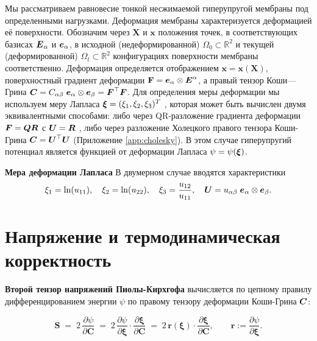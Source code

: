 Мы рассматриваем равновесие тонкой несжимаемой гиперупругой мембраны под определенными нагрузками.
Деформация мембраны характеризуется деформацией её поверхности. 
Обозначим через \(\mathbf{X}\) и \(\mathbf{x}\) положения точек, 
в соответствующих базисах \(\boldsymbol{E}_{\alpha}\) и \(\boldsymbol{e}_{\alpha}\), 
в исходной (недеформированной) \(\Omega_0 \subset \mathbb{R}^2\) и текущей (деформированной) \(\Omega_t \subset \mathbb{R}^2\)
конфигурациях поверхности мембраны соответственно. 
Деформация определяется отображением \(\mathbf{x} = \mathbf{x}(\mathbf{X})\), 
поверхностный градиент деформации \(\mathbf{F} = \boldsymbol{e}_{\alpha} \otimes \boldsymbol{E}^{\alpha}\),
а правый тензор Коши—Грина \(\boldsymbol{C} = C_{\alpha\beta} \;\boldsymbol{e}_{\alpha} \otimes \boldsymbol{e}_{\beta} = \boldsymbol{F}^{\top} \boldsymbol{F}\). 
Для определения меры деформации мы используем меру Лапласа \(\boldsymbol{\xi} = (\xi_1 , \xi_2 , \xi_3)^T\) \cite{xi2023},
которая может быть вычислен двумя эквивалентными способами: 
либо через QR-разложение градиента деформации \(\boldsymbol{F} = \boldsymbol{Q} \boldsymbol{R}\) с \(\boldsymbol{U} = \boldsymbol{R}\) , 
либо через разложение Холецкого правого тензора Коши-Грина \(\boldsymbol{C} = \boldsymbol{U}^{\top}\boldsymbol{U}\) (Приложение \ref{app:cholesky}).
В этом случае гиперупругий потенциал является функцией от деформации Лапласа \(\psi = \psi(\boldsymbol{\xi})\).


\textbf{Мера деформации Лапласа}
В двумерном случае вводятся характеристики
\begin{equation}
\xi_1 = \ln(u_{11}),\quad \xi_2 = \ln(u_{22}),\quad \xi_3 = \frac{u_{12}}{u_{11}}, 
\quad \boldsymbol{U} = u_{\alpha\beta} \; \boldsymbol{e}_{\alpha} \otimes \boldsymbol{e}_{\beta}.
\label{eq:laplace_coords}
\end{equation}



\section{Напряжение и термодинамическая корректность}
\textbf{Второй тензор напряжений Пиолы-Кирхгофа} вычисляется по цепному правилу дифференцированием энергии \(\psi\) 
по правому тензору деформации Коши-Грина \(\boldsymbol{C}\):

\begin{equation}
  \mathbf{S} \;=\; 2\,\frac{\partial \psi}{\partial \mathbf{C}}
  \;=\; 2\,\frac{\partial \psi}{\partial \boldsymbol\xi} \cdot \frac{\partial \boldsymbol\xi}{\partial \mathbf{C}}
  \;=\; 2\,\mathbf{r}(\boldsymbol\xi)\cdot\frac{\partial \boldsymbol\xi}{\partial \mathbf{C}},
  \qquad \mathbf{r}:=\frac{\partial \psi}{\partial \boldsymbol\xi}.
  \label{eq:chain-rule}
\end{equation}


